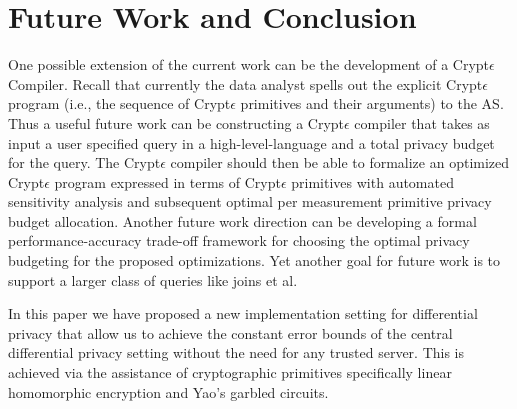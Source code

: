 \section{Future Work and Conclusion}
One possible extension of the current work can be the development of a
Crypt$\epsilon$ Compiler. Recall that currently the data analyst spells out the explicit Crypt$\epsilon$ program  (i.e., the sequence of Crypt$\epsilon$ primitives and their arguments) to the \textsf{AS}. Thus a useful future work can be constructing a Crypt$\epsilon$ compiler that takes as input a user specified query in a high-level-language and a total privacy budget for the query. The Crypt$\epsilon$
compiler should then be able to formalize an optimized Crypt$\epsilon$ program expressed in terms of Crypt$\epsilon$ primitives with automated sensitivity analysis and subsequent optimal per measurement primitive privacy budget allocation. 
Another future work direction can be developing a formal performance-accuracy trade-off framework for choosing the optimal privacy budgeting for the proposed optimizations. Yet another goal for future work is to support a larger class of queries like joins et al.
\par In this paper we have proposed a new implementation setting for differential privacy that allow us to achieve the constant error bounds of the central differential privacy setting without the need for any trusted server. This is achieved via the assistance of cryptographic primitives specifically linear homomorphic encryption and Yao's garbled circuits. 